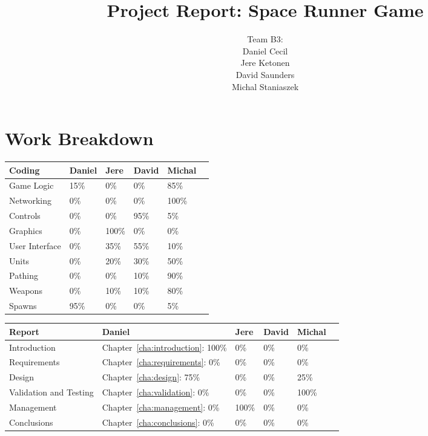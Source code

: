 \documentclass[10pt]{report}
\title{Project Report: Space Runner Game}
\author{Team B3:\\
Daniel Cecil\\
Jere Ketonen\\
David Saunders\\
Michal Staniaszek
}
\begin{document}
\maketitle
\tableofcontents
\chapter*{Work Breakdown}
\label{work-breakdown}

\thispagestyle{empty}

\begin{center}
  \begin{tabular}{|l||l|l|l|l|l|}\hline
    \textbf{Coding} & \textbf{Daniel} & \textbf{Jere} & \textbf{David}
    & \textbf{Michal} \\\hline\hline
    Game Logic &  15\% & 0\% & 0\% & 85\%\\\hline
    Networking &  0\% & 0\% & 0\% & 100\%\\\hline
    Controls &  0\% & 0\% & 95\% & 5\%\\\hline
    Graphics &  0\% & 100\% & 0\% & 0\%\\\hline
    User Interface &  0\% & 35\% & 55\% & 10\%\\\hline
    Units &  0\% & 20\% & 30\% & 50\%\\\hline
    Pathing &  0\% & 0\% & 10\% & 90\%\\\hline
    Weapons &  0\% & 10\% & 10\% & 80\%\\\hline
    Spawns &  95\% & 0\% & 0\% & 5\%\\\hline
  \end{tabular}\vspace*{1cm}

  \begin{tabular}{|l||l|l|l|l|l|}\hline
    \textbf{Report} & \textbf{Daniel} & \textbf{Jere} & \textbf{David}
    & \textbf{Michal}\\\hline\hline
    Introduction & Chapter~\ref{cha:introduction}: 100\% & 0\% & 0\% & 0\%\\\hline
    Requirements & Chapter~\ref{cha:requirements}: 0\% & 0\% & 0\% & 0\%\\\hline
    Design & Chapter~\ref{cha:design}: 75\% & 0\% & 0\% & 25\%\\\hline
    Validation and Testing & Chapter~\ref{cha:validation}: 0\% & 0\% & 0\% & 100\%\\\hline
    Management & Chapter~\ref{cha:management}: 0\% & 100\% & 0\% & 0\%\\\hline
    Conclusions & Chapter~\ref{cha:conclusions}: 0\% & 0\% & 0\% & 0\%\\\hline
  \end{tabular}
\end{center}
\end{document}

